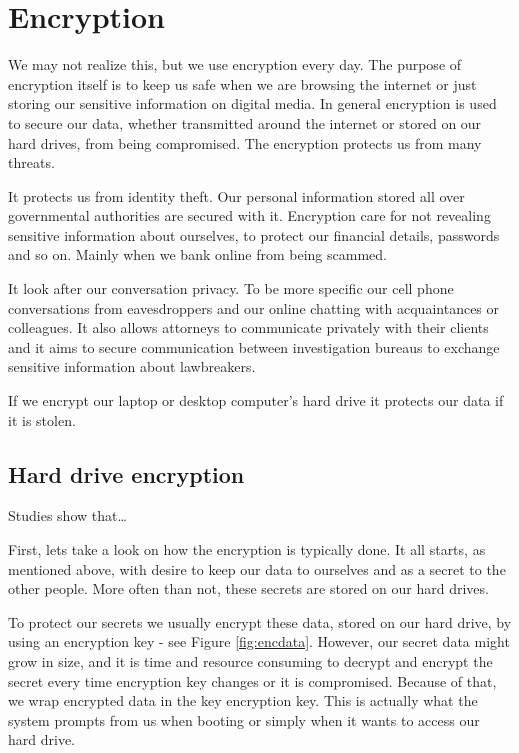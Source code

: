 \documentclass[../xdudla00-porting-Tang-to-Open-WRT.tex]{subfiles}
\begin{document}
\chapter{Encryption}\label{encryption}


We may not realize this, but we use encryption every day.
The purpose of encryption itself is to keep us safe when we are browsing the internet or just storing our sensitive information on digital media. 
In general encryption is used to secure our data, whether transmitted around the internet or stored on our hard drives, from being compromised.
The encryption protects us from many threats.

It protects us from identity theft. 
Our personal information stored all over governmental authorities are secured with it.
Encryption care for not revealing sensitive information about ourselves, to protect our financial details, passwords and so on. 
Mainly when we bank online from being scammed.

It look after our conversation privacy. 
To be more specific our cell phone conversations from eavesdroppers and our online chatting with acquaintances or colleagues. 
It also allows attorneys to communicate privately with their clients and it aims to secure communication between investigation bureaus to exchange sensitive information about lawbreakers.

If we encrypt our laptop or desktop computer's hard drive it protects our data if it is stolen. 

\section{Hard drive encryption}


Studies show that\dots {}

First, lets take a look on how the encryption is typically done.
It all starts, as mentioned above, with desire to keep our data to ourselves and as a secret to the other people.
More often than not, these secrets are stored on our hard drives.

To protect our secrets we usually encrypt these data, stored on our hard drive, by using an encryption key - see Figure \ref{fig:encdata}.
However, our secret data might grow in size, and it is time and resource consuming to decrypt and encrypt the secret every time encryption key changes or it is compromised.
Because of that, we wrap encrypted data in the key encryption key. 
This is actually what the system prompts from us when booting or simply when it wants to access our hard drive.
\end{document}
